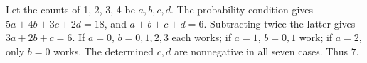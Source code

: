 Let the counts of 1, 2, 3, 4 be $a,b,c,d$. The probability condition gives $5a+4b+3c+2d=18$, and $a+b+c+d=6$. Subtracting twice the latter gives $3a+2b+c=6$. If $a=0$, $b=0,1,2,3$ each works; if $a=1$, $b=0,1$ work; if $a=2$, only $b=0$ works. The determined $c,d$ are nonnegative in all seven cases. Thus $\boxed7$.
